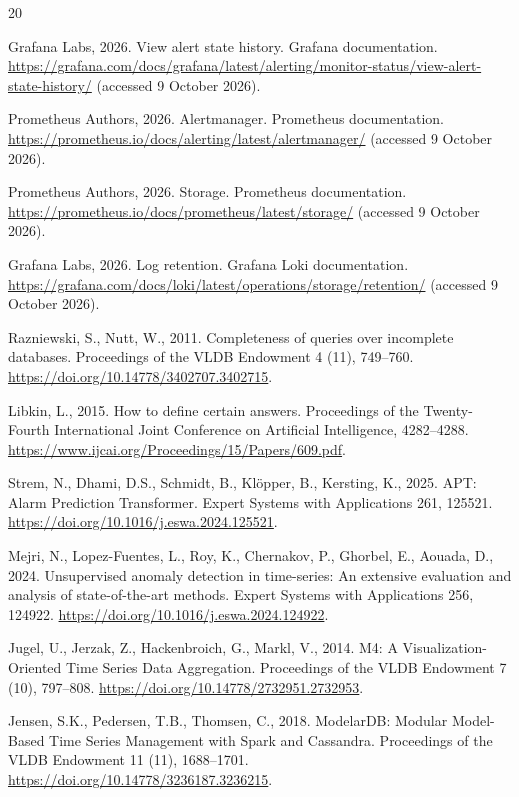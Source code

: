 \documentclass[a4paper,fleqn]{cas-dc}
\begin{document}
\begin{thebibliography}{20}

Grafana Labs, 2026. View alert state history. Grafana documentation. \url{https://grafana.com/docs/grafana/latest/alerting/monitor-status/view-alert-state-history/} (accessed 9 October 2026).

Prometheus Authors, 2026. Alertmanager. Prometheus documentation. \url{https://prometheus.io/docs/alerting/latest/alertmanager/} (accessed 9 October 2026).

Prometheus Authors, 2026. Storage. Prometheus documentation. \url{https://prometheus.io/docs/prometheus/latest/storage/} (accessed 9 October 2026).

Grafana Labs, 2026. Log retention. Grafana Loki documentation. \url{https://grafana.com/docs/loki/latest/operations/storage/retention/} (accessed 9 October 2026).

Razniewski, S., Nutt, W., 2011. Completeness of queries over incomplete databases. Proceedings of the VLDB Endowment 4 (11), 749--760. \url{https://doi.org/10.14778/3402707.3402715}.

Libkin, L., 2015. How to define certain answers. Proceedings of the Twenty-Fourth International Joint Conference on Artificial Intelligence, 4282--4288. \url{https://www.ijcai.org/Proceedings/15/Papers/609.pdf}.

Strem, N., Dhami, D.S., Schmidt, B., Kl\"opper, B., Kersting, K., 2025. APT: Alarm Prediction Transformer. Expert Systems with Applications 261, 125521. \url{https://doi.org/10.1016/j.eswa.2024.125521}.

Mejri, N., Lopez-Fuentes, L., Roy, K., Chernakov, P., Ghorbel, E., Aouada, D., 2024. Unsupervised anomaly detection in time-series: An extensive evaluation and analysis of state-of-the-art methods. Expert Systems with Applications 256, 124922. \url{https://doi.org/10.1016/j.eswa.2024.124922}.

Jugel, U., Jerzak, Z., Hackenbroich, G., Markl, V., 2014. M4: A Visualization-Oriented Time Series Data Aggregation. Proceedings of the VLDB Endowment 7 (10), 797--808. \url{https://doi.org/10.14778/2732951.2732953}.

Jensen, S.K., Pedersen, T.B., Thomsen, C., 2018. ModelarDB: Modular Model-Based Time Series Management with Spark and Cassandra. Proceedings of the VLDB Endowment 11 (11), 1688--1701. \url{https://doi.org/10.14778/3236187.3236215}.


\end{thebibliography}
\end{document}
